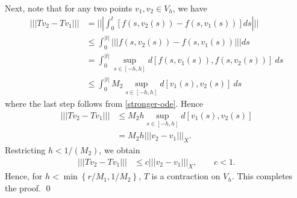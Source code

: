 %
%
Next, note that for any two points $v_1, v_2 \in
V_h$, we have
%
%
\begin{equation}
	\label{cont-part-1}
	\begin{split}
		| | | Tv_2 - Tv_1 | | | 
		& = | | | \int_0^t \left[ f(s, v_2(s) ) - f(s, v_1 (s) ) \right]ds | | |
		\\
    & \le \int_0^{|t|} | | | f(s, v_2(s) ) - f(s, v_1 (s) ) | | | ds
		\\
    & = \int_0^{|t|} \sup_{s \in [-h, h]} d[f(s, v_1(s) ), f(s, v_2 (s) )] \ ds
		\\
    & \le \int_0^{|t|} M_2 \sup_{s \in [-h, h]} d[v_1(s), v_2 (s)] \
		ds
		\end{split}
\end{equation}
%
%
where the last step follows from \eqref{stronger-ode}.
Hence
\begin{equation*}
	\begin{split}
		| | | Tv_2 - Tv_1 | | | 
		& \le M_2 h \sup_{s \in [-h, h]} d[v_1(s), v_2 (s)]
		\\
		& = M_2 h   | | | v_2 - v_1 | | |_X.  
	\end{split}
\end{equation*}
%
%
Restricting $h < 1/(M_2)$, we obtain
\begin{equation*}
	\begin{split}
		| | | Tv_2 - Tv_1 | | | & \le c | | | v_2 - v_1 | | |_X, \qquad c <1. 
	\end{split}
\end{equation*}
Hence, for $h < \min\left\{r/M_1, 1/M_2  \right\}$, $T$ is a contraction on
$V_h$.  This completes \\ the proof. \qed
%
%
%
%
%
%
%
